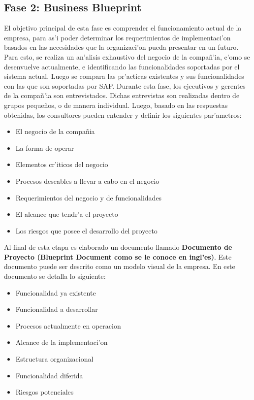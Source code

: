 \subsection{Fase 2: Business Blueprint}
El objetivo principal de esta fase es comprender el funcionamiento actual de la empresa, para as'i poder determinar los requerimientos de implementaci'on basados en las necesidades que la organizaci'on pueda presentar en un futuro. Para esto, se realiza un an'alisis exhaustivo del negocio de la compa\~n'ia, c'omo se desenvuelve actualmente, e identificando las funcionalidades soportadas por el sistema actual. Luego se compara las pr'acticas existentes y sus funcionalidades  con las que son soportadas por SAP. 
\newline
\newline
\indent Durante esta fase, los ejecutivos y gerentes de la compa\~n'ia son entrevistados. Dichas entrevistas son realizadas dentro de grupos peque\~nos, o de manera individual. Luego, basado en las respuestas obtenidas, los consultores pueden entender y definir los siguientes par'ametros:
\begin{itemize}
\item El negocio de la compa\~nia
\item La forma de operar
\item Elementos cr'iticos del negocio
\item Procesos deseables a llevar a cabo en el negocio
\item Requerimientos del negocio y de funcionalidades
\item El alcance que tendr'a el proyecto
\item Los riesgos que posee el desarrollo del proyecto
\end{itemize}
Al final de esta etapa es elaborado un documento llamado \textbf{Documento de Proyecto (Blueprint Document como se le conoce en ingl'es)}. 
Este documento puede ser descrito como un modelo visual de la empresa. En este documento se detalla lo siguiente:
\begin{itemize}
\item Funcionalidad ya existente
\item Funcionalidad a desarrollar
\item Procesos actualmente en operacion
\item Alcance de la implementaci'on
\item Estructura organizacional
\item Funcionalidad diferida
\item Riesgos potenciales
\end{itemize}
